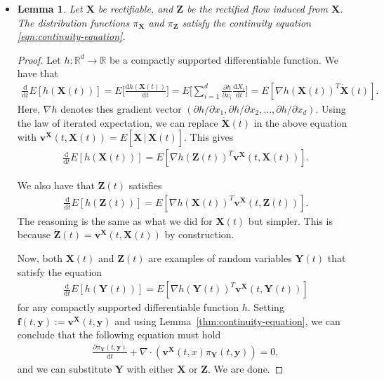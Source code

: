 \documentclass[10pt]{article}
\newtheorem{lemma}{Lemma}
\newcommand{\dee}{\mathrm{d}}
\newcommand{\ve}[1]{\mathbf{#1}}
\newcommand{\Real}{\mathbb{R}}
\begin{document}
\begin{itemize}
  \item \begin{lemma} \label{thm:rectified-flow-and-continuity-equation}
    Let $\ve{X}$ be rectifiable, and $\ve{Z}$ be the rectified flow induced from $\ve{X}$. The distribution functions $\pi_{\ve{X}}$ and $\pi_{\ve{Z}}$ satisfy the continuity equation \eqref{eqn:continuity-equation}.
  \end{lemma}
  
  \begin{proof}
    Let $h: \Real^d \rightarrow \Real$ be a compactly supported differentiable function. We have that
    \begin{align*}
      \frac{\dee}{\dee t} E[h(\ve{X}(t))] = E\bigg[ \frac{\dee h(\ve{X}(t))}{\dee t} \bigg] = E\bigg[ \sum_{i=1}^d \frac{\partial h}{\partial x_i} \frac{\dee X_i}{\dee t} \bigg] = E[\nabla h(\ve{X}(t))^T \dot{\ve{X}}(t)].
    \end{align*}
    Here, $\nabla h$ denotes thes gradient vector $(\partial h/\partial x_1, \partial h /\partial x_2, \dotsc, \partial h / \partial x_d)$. Using the law of iterated expectation, we can replace $\dot{\ve{X}}(t)$ in the above equation with $\ve{v}^{\ve{X}}(t, \ve{X}(t)) = E[\dot{\ve{X}}\, |\, \ve{X}(t)]$. This gives
    \begin{align*}
      \frac{\dee}{\dee t} E[h(\ve{X}(t))] = E[\nabla h(\ve{Z}(t))^T \ve{v}^{\ve{X}}(t, \ve{X}(t))].
    \end{align*}

    We also have that $\ve{Z}(t)$ satisfies
    \begin{align*}
      \frac{\dee}{\dee t} E[h(\ve{Z}(t))] = E[\nabla h(\ve{X}(t))^T \ve{v}^{\ve{X}}(t, \ve{Z}(t))].
    \end{align*}
    The reasoning is the same as what we did for $\ve{X}(t)$ but simpler. This is because $\dot{\ve{Z}}(t) = \ve{v}^{\ve{X}}(t, \ve{X}(t))$ by construction.

    Now, both $\ve{X}(t)$ and $\ve{Z}(t)$ are examples of random variables $\ve{Y}(t)$ that satisfy the equation 
    \begin{align*}
      \frac{\dee}{\dee t} E[h(\ve{Y}(t))] = E[\nabla h(\ve{Y}(t))^T \ve{v}^{\ve{X}}(t, \ve{Y}(t))]
    \end{align*}
    for any compactly supported differentiable function $h$. Setting $\ve{f}(t, \ve{y}) := \ve{v}^{\ve{X}}(t, \ve{y})$ and using Lemma~\ref{thm:continuity-equation}, we can conclude that the following equation must hold
    \begin{align*}
      \frac{\partial \pi_\ve{Y}(t, \ve{y})}{\dee t} + \nabla \cdot (\ve{v}^{\ve{X}}(t, x) \pi_{\ve{Y}}(t, \ve{y})) = 0,
    \end{align*}
    and we can substitute $\ve{Y}$ with either $\ve{X}$ or $\ve{Z}$. We are done.
  \end{proof}


\end{itemize}
\end{document}
